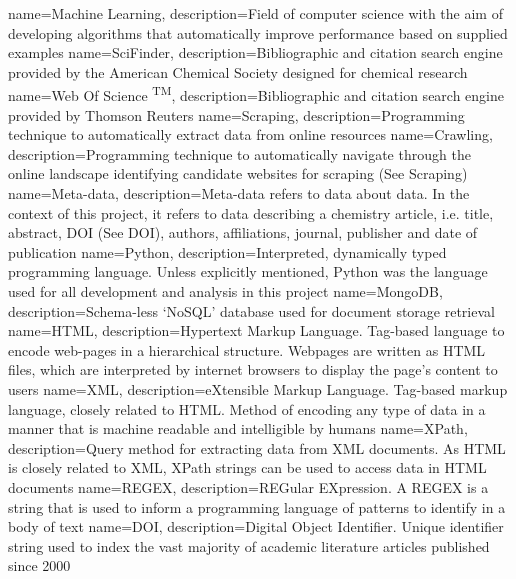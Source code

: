 {
name={Machine Learning},
description={Field of computer science with the aim of developing algorithms that automatically improve performance based on supplied examples \cite{glossarymachinelearning}} 
}
{
name={SciFinder\textsuperscript{\textregistered}},
description={Bibliographic and citation search engine provided by the American Chemical Society designed for chemical research} 
}
{
name={Web Of Science	\textsuperscript{TM}},
description={Bibliographic and citation search engine provided by Thomson Reuters} 
}
{
name={Scraping},
description={Programming technique to automatically extract data from online resources} 
}
{
name={Crawling},
description={Programming technique to automatically navigate through the online landscape identifying candidate websites for scraping (See Scraping)} 
}
{
name={Meta-data},
description={Meta-data refers to data about data. In the context of this project, it refers to data describing a chemistry article, i.e. title, abstract, DOI (See DOI), authors, affiliations, journal, publisher and date of publication}
}
{
name={Python},
description={Interpreted, dynamically typed programming language. Unless explicitly mentioned, Python was the language used for all development and analysis in this project} 
}
{
name={MongoDB},
description={Schema-less `NoSQL' database used for document storage retrieval} 
}
{
name={HTML},
description={Hypertext Markup Language. Tag-based language to encode web-pages in a hierarchical structure. Webpages are written as HTML files, which are interpreted by internet browsers to display the page's content to users} 
}
{
name={XML},
description={eXtensible Markup Language. Tag-based markup language, closely related to HTML. Method of encoding any type of data in a manner that is machine readable and intelligible by humans} 
}
{
name={XPath},
description={Query method for extracting data from XML documents. As HTML is closely related to XML, XPath strings can be used to access data in HTML documents} 
}
{
name={REGEX},
description={REGular EXpression. A REGEX is a string that is used to inform a programming language of patterns to identify in a body of text} 
}
{
name={DOI},
description={Digital Object Identifier. Unique identifier string used to index the vast majority of academic literature articles published since 2000 \cite{glossarydoi}} 
}
